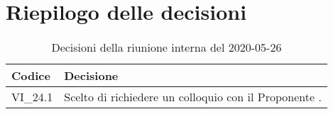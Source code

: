 \section{Riepilogo delle decisioni}
\begin{longtable}{
	 >{\centering}p{} >{}p{} }

	\caption{Decisioni della riunione interna del 2020-05-26}\\

	\textbf{\color{white}Codice} &
	\textbf{\color{white}Decisione}
	\tabularnewline
	\endhead

	VI\_24.1 & Scelto di richiedere un colloquio con il Proponente\ped{\textit{G}} \Proponente{}. \\
\end{longtable}
